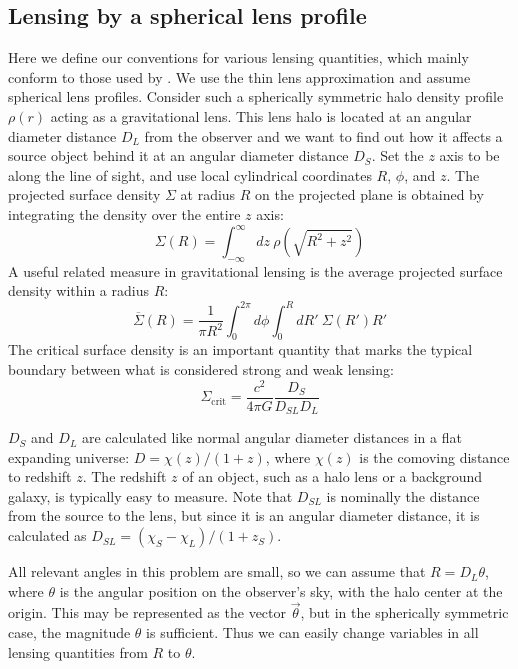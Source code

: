 \documentclass[10pt]{article}
\begin{document}
\subsection{Lensing by a spherical lens profile}
Here we define our conventions for various lensing quantities, which mainly conform to those used by \citet{Dodelson2017}. We use the thin lens approximation and assume spherical lens profiles. Consider such a spherically symmetric halo density profile $\rho(r)$ acting as a gravitational lens. This lens halo is located at an angular diameter distance $D_L$ from the observer and we want to find out how it affects a source object behind it at an angular diameter distance $D_S$. Set the $z$ axis to be along the line of sight, and use local cylindrical coordinates $R$, $\phi$, and $z$. The projected surface density $\Sigma$ at radius $R$ on the projected plane is obtained by integrating the density over the entire $z$ axis:
\begin{equation} \label{sigma}
\Sigma(R) = \int_{-\infty}^{\infty}{dz\ \rho(\sqrt{R^2 + z^2})}
\end{equation}
A useful related measure in gravitational lensing is the average projected surface density within a radius $R$:
\begin{equation} \label{sigmabar}
\overline{\Sigma}(R) = \frac{1}{\pi R^2} \int_0^{2\pi}{d\phi \int_0^{R}{dR'~\Sigma(R')R'}}
\end{equation}
The critical surface density is an important quantity that marks the typical boundary between what is considered strong and weak lensing:
\begin{equation} \label{sigmacrit}
\Sigma_\mathrm{crit} = \frac{c^2}{4\pi G} \frac{D_S}{D_{SL} D_L}
\end{equation}

$D_S$ and $D_L$ are calculated like normal angular diameter distances in a flat expanding universe: $D = \chi(z)/(1 + z)$, where $\chi(z)$ is the comoving distance to redshift $z$. The redshift $z$ of an object, such as a halo lens or a background galaxy, is typically easy to measure. Note that $D_{SL}$ is nominally the distance from the source to the lens, but since it is an angular diameter distance, it is calculated as $D_{SL} = (\chi_S - \chi_L)/(1 + z_S)$.

All relevant angles in this problem are small, so we can assume that $R = D_L \theta$, where $\theta$ is the angular position on the observer's sky, with the halo center at the origin. This may be represented as the vector $\vec{\theta}$, but in the spherically symmetric case, the magnitude $\theta$ is sufficient. Thus we can easily change variables in all lensing quantities from $R$ to $\theta$.
\end{document}
